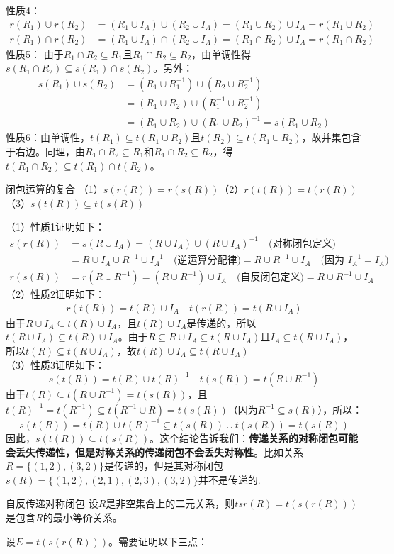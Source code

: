 \documentclass[lang=cn,11pt]{elegantbook}
\begin{document}
性质4：\vspace{-20pt}\begin{align*}
r(R_1) \cup r(R_2) &= (R_1 \cup I_A) \cup (R_2 \cup I_A) = (R_1 \cup R_2) \cup I_A = r(R_1 \cup R_2) \\
r(R_1) \cap r(R_2) &= (R_1 \cup I_A) \cap (R_2 \cup I_A) = (R_1 \cap R_2) \cup I_A = r(R_1 \cap R_2)
\end{align*}
性质5：
由于$R_1 \cap R_2 \subseteq R_1$且$R_1 \cap R_2 \subseteq R_2$，由单调性得$s(R_1 \cap R_2) \subseteq s(R_1) \cap s(R_2)$。另外：\vspace{-10pt}
\begin{align*}
s(R_1) \cup s(R_2) &= (R_1 \cup R_1^{-1}) \cup (R_2 \cup R_2^{-1}) \\
&= (R_1 \cup R_2) \cup (R_1^{-1} \cup R_2^{-1}) \\
&= (R_1 \cup R_2) \cup (R_1 \cup R_2)^{-1} = s(R_1 \cup R_2)
\end{align*}
性质6：由单调性，$t(R_1) \subseteq t(R_1 \cup R_2)$且$t(R_2) \subseteq t(R_1 \cup R_2)$，故并集包含于右边。同理，由$R_1 \cap R_2 \subseteq R_1$和$R_1 \cap R_2 \subseteq R_2$，得$t(R_1 \cap R_2) \subseteq t(R_1) \cap t(R_2)$。
\begin{theorem}{闭包运算的复合}
（1）$s(r(R)) = r(s(R))$\quad（2）$r(t(R)) = t(r(R))$\quad（3）$s(t(R)) \subseteq t(s(R))$
\end{theorem}
（1）性质1证明如下：
\begin{align*}
s(r(R)) &= s(R \cup I_A) = (R \cup I_A) \cup (R \cup I_A)^{-1} \quad \text{(对称闭包定义)} \\
&= R \cup I_A \cup R^{-1} \cup I_A^{-1} \quad \text{(逆运算分配律)} = R \cup R^{-1} \cup I_A \quad \text{(因为 $I_A^{-1} = I_A$)} \\
r(s(R)) &= r(R \cup R^{-1}) = (R \cup R^{-1}) \cup I_A \quad \text{(自反闭包定义)} = R \cup R^{-1} \cup I_A
\end{align*}
（2）性质2证明如下：
\begin{align*}
r(t(R)) = t(R) \cup I_A \quad 
t(r(R)) = t(R \cup I_A) 
\end{align*}
由于$R \cup I_A \subseteq t(R) \cup I_A$，且$t(R) \cup I_A$是传递的，所以$t(R \cup I_A) \subseteq t(R) \cup I_A$。由于$R \subseteq R \cup I_A \subseteq t(R \cup I_A)$且$I_A \subseteq t(R \cup I_A)$，所以$t(R) \subseteq t(R \cup I_A)$，故$t(R) \cup I_A \subseteq t(R \cup I_A)$\\
（3）性质3证明如下：
\[s(t(R)) = t(R) \cup t(R)^{-1} \quad
t(s(R)) = t(R \cup R^{-1}) \]
由于$t(R) \subseteq t(R \cup R^{-1}) = t(s(R))$，且$t(R)^{-1} = t(R^{-1}) \subseteq t(R^{-1} \cup R) = t(s(R))$（因为$R^{-1} \subseteq s(R)$），所以：
\[
s(t(R)) = t(R) \cup t(R)^{-1} \subseteq t(s(R)) \cup t(s(R)) = t(s(R))
\]
因此，$s(t(R)) \subseteq t(s(R))$。这个结论告诉我们：\textbf{传递关系的对称闭包可能会丢失传递性，但是对称关系的传递闭包不会丢失对称性}。比如关系$R=\{(1,2),(3,2)\}$是传递的，但是其对称闭包$s(R)=\{(1,2),(2,1),(2,3),(3,2)\}$并不是传递的.
\begin{theorem}{自反传递对称闭包}
    设$R$是非空集合上的二元关系，则$tsr(R)=t(s(r(R)))$是包含$R$的最小等价关系。
\end{theorem}
设$E = t(s(r(R)))$。需要证明以下三点：
\end{document}
